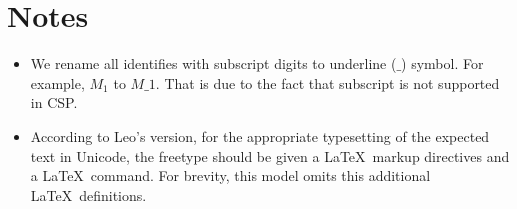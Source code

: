 \documentclass{report} %
\begin{document}
\section{Notes}
\begin{itemize}
    \item We rename all identifies with subscript digits to underline ($\_$) symbol. For example, $M_1$ to $M\_1$. That is due to the fact that subscript is not supported in CSP.
    \item According to Leo's version, for the appropriate typesetting of the expected text in Unicode, the freetype should be given a \LaTeX\ markup directives and a \LaTeX\ command. For brevity, this model omits this additional \LaTeX\ definitions. 
\end{itemize}
%
%
%
%
%
%
%
%
\end{document}
